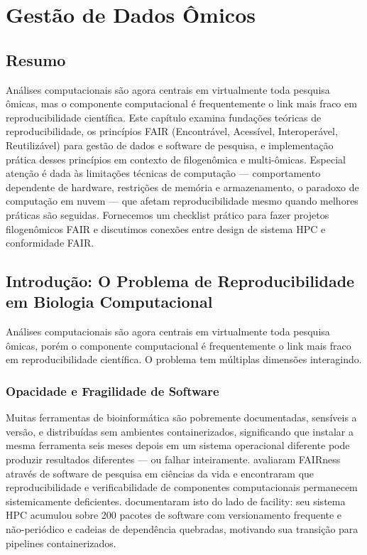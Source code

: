 
\chapter{Gestão de Dados Ômicos}

\section*{Resumo}

Análises computacionais são agora centrais em virtualmente toda pesquisa ômicas, mas o componente computacional é frequentemente o link mais fraco em reproducibilidade científica. Este capítulo examina fundações teóricas de reproducibilidade, os princípios FAIR (Encontrável, Acessível, Interoperável, Reutilizável) para gestão de dados e software de pesquisa, e implementação prática desses princípios em contexto de filogenômica e multi-ômicas. Especial atenção é dada às limitações técnicas de computação --- comportamento dependente de hardware, restrições de memória e armazenamento, o paradoxo de computação em nuvem --- que afetam reproducibilidade mesmo quando melhores práticas são seguidas. Fornecemos um checklist prático para fazer projetos filogenômicos FAIR e discutimos conexões entre design de sistema HPC e conformidade FAIR.

\section{Introdução: O Problema de Reproducibilidade em Biologia Computacional}

Análises computacionais são agora centrais em virtualmente toda pesquisa ômicas, porém o componente computacional é frequentemente o link mais fraco em reproducibilidade científica. O problema tem múltiplas dimensões interagindo.

\subsection{Opacidade e Fragilidade de Software}

Muitas ferramentas de bioinformática são pobremente documentadas, sensíveis a versão, e distribuídas sem ambientes containerizados, significando que instalar a mesma ferramenta seis meses depois em um sistema operacional diferente pode produzir resultados diferentes --- ou falhar inteiramente. \textcite{martindelico2024} avaliaram FAIRness através de software de pesquisa em ciências da vida e encontraram que reproducibilidade e verificabilidade de componentes computacionais permanecem sistemicamente deficientes. \textcite{zafeiropoulos2021} documentaram isto do lado de facility: seu sistema HPC acumulou sobre 200 pacotes de software com versionamento frequente e não-periódico e cadeias de dependência quebradas, motivando sua transição para pipelines containerizados.

